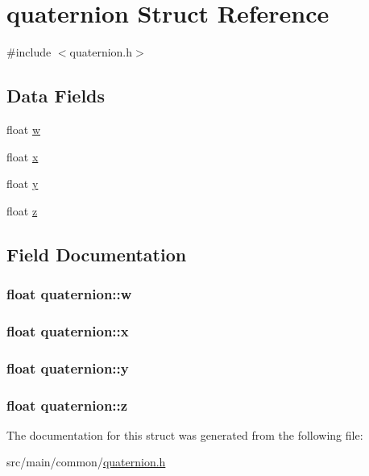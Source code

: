 \hypertarget{structquaternion}{\section{quaternion Struct Reference}
\label{structquaternion}
}


{\ttfamily \#include $<$quaternion.\+h$>$}

\subsection*{Data Fields}
\begin{DoxyCompactItemize}
\item 
float \hyperlink{structquaternion_ab2b38aca1971114e0ba4218b75d7f472}{w}
\item 
float \hyperlink{structquaternion_acdcda48f9dd7ff35873aae38fa33ab78}{x}
\item 
float \hyperlink{structquaternion_a48e3d1fbf5e12eb54985c32b45dd8303}{y}
\item 
float \hyperlink{structquaternion_a538598007238d399f79ddcecd39ef5cf}{z}
\end{DoxyCompactItemize}


\subsection{Field Documentation}
\hypertarget{structquaternion_ab2b38aca1971114e0ba4218b75d7f472}{
\subsubsection[{w}]{\setlength{\rightskip}{0pt plus 5cm}float quaternion\+::w}}\label{structquaternion_ab2b38aca1971114e0ba4218b75d7f472}
\hypertarget{structquaternion_acdcda48f9dd7ff35873aae38fa33ab78}{
\subsubsection[{x}]{\setlength{\rightskip}{0pt plus 5cm}float quaternion\+::x}}\label{structquaternion_acdcda48f9dd7ff35873aae38fa33ab78}
\hypertarget{structquaternion_a48e3d1fbf5e12eb54985c32b45dd8303}{
\subsubsection[{y}]{\setlength{\rightskip}{0pt plus 5cm}float quaternion\+::y}}\label{structquaternion_a48e3d1fbf5e12eb54985c32b45dd8303}
\hypertarget{structquaternion_a538598007238d399f79ddcecd39ef5cf}{
\subsubsection[{z}]{\setlength{\rightskip}{0pt plus 5cm}float quaternion\+::z}}\label{structquaternion_a538598007238d399f79ddcecd39ef5cf}


The documentation for this struct was generated from the following file\+:\begin{DoxyCompactItemize}
\item 
src/main/common/\hyperlink{quaternion_8h}{quaternion.\+h}\end{DoxyCompactItemize}
